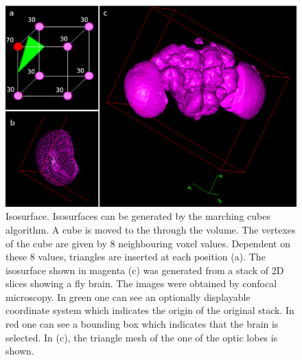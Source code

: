 \documentclass[a4paper,10pt]{article}
\begin{document}
\begin{figure}[m]
  \centering
  \includegraphics[width=\textwidth]{images/surface_montage.eps}
  \caption{Isosurface. Isosurfaces can be generated by the marching cubes algorithm. A cube is moved to the through the volume. The vertexes of the cube are given by 8 neighbouring voxel values. Dependent on these 8 values, triangles are inserted at each position (a). The isosurface shown in magenta (c) was generated from a stack of 2D slices showing a fly brain. The images were obtained by confocal microscopy. In green one can see an optionally displayable coordinate system which indicates the origin of the original stack. In red one can see a bounding box which indicates that the brain is selected. In (c), the triangle mesh of the one of the optic lobes is shown.}
  \label{fig:surface}
\end{figure}
\end{document}
